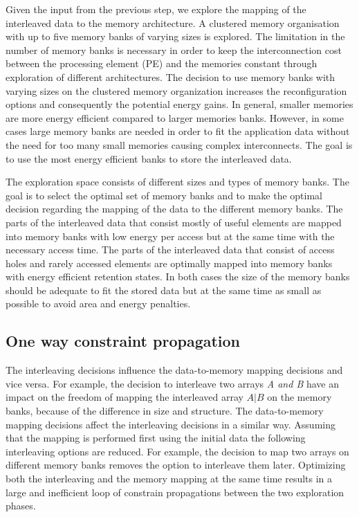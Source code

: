 Given the input from the previous step, we explore the mapping of the interleaved data to the memory architecture.
A clustered memory organisation with up to five memory banks of varying sizes is explored. 
The limitation in the number of memory banks is necessary in order to keep the interconnection cost between the processing element (PE) and the memories constant through exploration of different architectures. 
The decision to use memory banks with varying sizes on the clustered memory organization increases the reconfiguration options and consequently the potential energy gains. 
In general, smaller memories are more energy efficient compared to larger memories banks. 
However, in some cases large memory banks are needed in order to fit the application data without the need for too many small memories causing complex interconnects. 
The goal is to use the most energy efficient banks to store the interleaved data.

The exploration space consists of different sizes and types of memory banks.
The goal is to select the optimal set of memory banks and to make  the optimal decision regarding the mapping of the data to the different memory banks.
The parts of the interleaved data that consist mostly of useful elements are mapped into memory banks with low energy per access but at the same time with the necessary access time.
The parts of the interleaved data that consist of access holes and rarely accessed elements are optimally mapped into memory banks with energy efficient retention states.
In both cases the size of  the memory banks should be adequate to fit the stored data but at the same time as small as possible to avoid area and energy penalties.

\subsection{One way constraint propagation}

The interleaving decisions influence the data-to-memory mapping decisions and vice versa.
For example, the decision to interleave two arrays \textit{A and B} have an impact on the freedom of mapping the interleaved array $A\vert B$ on the memory banks, because of the difference in size and structure.
The data-to-memory mapping decisions affect the interleaving decisions in a similar way.
Assuming that the mapping is performed first using the initial data the following interleaving options are reduced.
For example, the decision to map two arrays on different memory banks removes the option to interleave them later.
Optimizing both the interleaving and the memory mapping at the same time results in a large and inefficient loop of constrain propagations between the two exploration phases.
 
